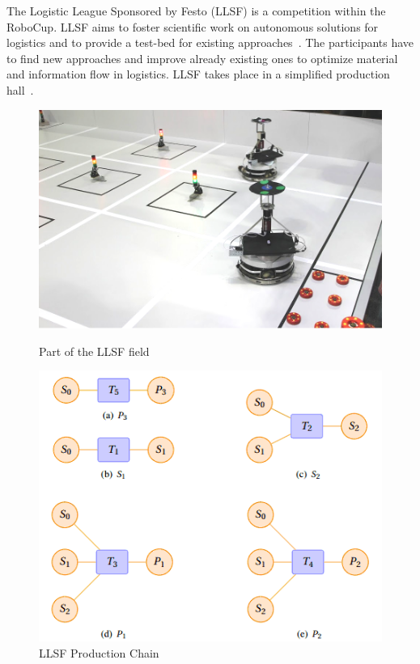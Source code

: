 \label{sec:llsf}
The Logistic League Sponsored by Festo (LLSF) is a competition within the RoboCup. LLSF aims to foster scientific work on autonomous solutions for logistics and to provide a test-bed for existing approaches~\cite{LLSFTestbed}. The participants have to find new approaches and improve already existing ones to optimize material and information flow in logistics.
LLSF takes place  in a simplified production hall~\cite{LLSFRules}.
\begin{figure}
\begin{minipage}[b]{0.5\linewidth}
\includegraphics[scale=0.23]{pics/llsf}
\caption{Part of the LLSF field}
\label{fig:llsf_field}
\end{minipage}
\quad
\begin{minipage}[b]{0.5\linewidth}
\includegraphics[scale=0.45]{pics/production_chain}
\caption{LLSF Production Chain~\cite{LLSFRules}}
\label{fig:llsf_chain}
\end{minipage}
\end{figure}
